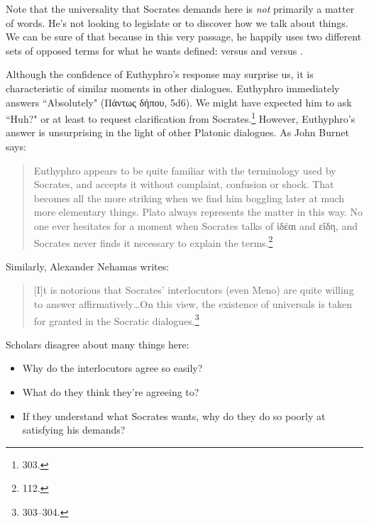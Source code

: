 \documentclass[11pt]{article}
\begin{document}
Note that the universality that Socrates demands here is \emph{not}
primarily a matter of words.  He's not looking to legislate or to discover
how we talk about things.  We can be sure of that because in this very
passage, he happily uses two different sets of opposed terms for what he
wants defined:  versus  and
 versus .

Although the confidence of Euthyphro's response may surprise us, it is
characteristic of similar moments in other dialogues.  Euthyphro
immediately answers ``Absolutely" ({\g Πάντως δήπου}, 5d6).  We might have
expected him to ask ``Huh?" or at least to request clarification from
Socrates.\footnote{\citet{nehamas1975} 303.}  However, Euthyphro's answer
is unsurprising in the light of other Platonic dialogues.  As John Burnet
says:

\begin{quote}

    Euthyphro appears to be quite familiar with the terminology used by
    Socrates, and accepts it without complaint, confusion or shock.  That
    becomes all the more striking when we find him boggling later at much
    more elementary things.  Plato always represents the matter in this
    way.  No one ever hesitates for a moment when Socrates talks of {\g
    ἰδέαι} and {\g εἴδη}, and Socrates never finds it necessary to explain
    the terms.\footnote{\citet{burnet1924} 112.}

\end{quote}

Similarly, Alexander Nehamas writes:

\begin{quote}

    [I]t is notorious that Socrates' interlocutors (even Meno) are quite
    willing to answer affirmatively{\ldots}On this view, the existence of
    universals is taken for granted in the Socratic
    dialogues.\footnote{\citet{nehamas1975} 303--304.}

\end{quote}

Scholars disagree about many things here:

\begin{itemize}

    \item Why do the interlocutors agree so easily?

    \item What do they think they're agreeing to?

    \item If they understand what Socrates wants, why do they do so poorly
        at satisfying his demands?

\end{itemize}
\end{document}
